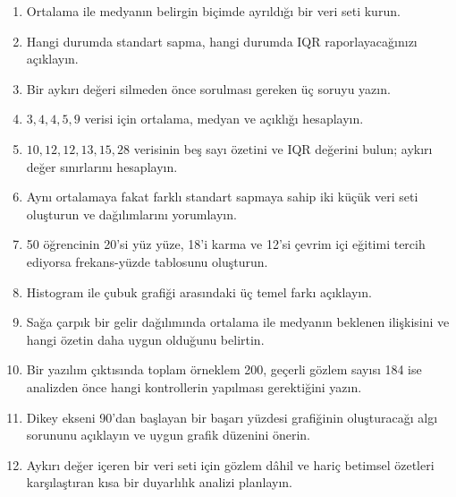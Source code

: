 \begin{enumerate}
  \item Ortalama ile medyanın belirgin biçimde ayrıldığı bir veri seti kurun.
  \item Hangi durumda standart sapma, hangi durumda IQR raporlayacağınızı açıklayın.
  \item Bir aykırı değeri silmeden önce sorulması gereken üç soruyu yazın.
  \item $3,4,4,5,9$ verisi için ortalama, medyan ve açıklığı hesaplayın.
  \item $10,12,12,13,15,28$ verisinin beş sayı özetini ve IQR değerini bulun;
  aykırı değer sınırlarını hesaplayın.
  \item Aynı ortalamaya fakat farklı standart sapmaya sahip iki küçük veri
  seti oluşturun ve dağılımlarını yorumlayın.
  \item 50 öğrencinin 20'si yüz yüze, 18'i karma ve 12'si çevrim içi eğitimi
  tercih ediyorsa frekans-yüzde tablosunu oluşturun.
  \item Histogram ile çubuk grafiği arasındaki üç temel farkı açıklayın.
  \item Sağa çarpık bir gelir dağılımında ortalama ile medyanın beklenen
  ilişkisini ve hangi özetin daha uygun olduğunu belirtin.
  \item Bir yazılım çıktısında toplam örneklem 200, geçerli gözlem sayısı 184
  ise analizden önce hangi kontrollerin yapılması gerektiğini yazın.
  \item Dikey ekseni 90'dan başlayan bir başarı yüzdesi grafiğinin oluşturacağı
  algı sorununu açıklayın ve uygun grafik düzenini önerin.
  \item Aykırı değer içeren bir veri seti için gözlem dâhil ve hariç betimsel
  özetleri karşılaştıran kısa bir duyarlılık analizi planlayın.
\end{enumerate}